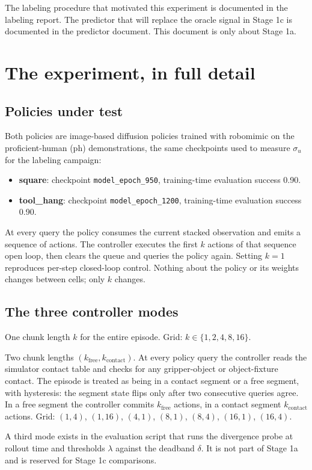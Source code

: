 \documentclass[11pt]{article}
\begin{document}
The labeling procedure that motivated this experiment is documented in the labeling
report. The predictor that will replace the oracle signal in Stage 1c is documented
in the predictor document. This document is only about Stage 1a.

\section{The experiment, in full detail}

\subsection{Policies under test}

Both policies are image-based diffusion policies trained with robomimic on the
proficient-human (ph) demonstrations, the same checkpoints used to measure
$\sigma_u$ for the labeling campaign:

\begin{itemize}[leftmargin=1.4em]
\item \textbf{square}: checkpoint \texttt{model\_epoch\_950}, training-time
evaluation success 0.90.
\item \textbf{tool\_hang}: checkpoint \texttt{model\_epoch\_1200}, training-time
evaluation success 0.90.
\end{itemize}

At every query the policy consumes the current stacked observation and emits a
sequence of actions. The controller executes the first $k$ actions of that sequence
open loop, then clears the queue and queries the policy again. Setting $k{=}1$
reproduces per-step closed-loop control. Nothing about the policy or its weights
changes between cells; only $k$ changes.

\subsection{The three controller modes}

\begin{description}[leftmargin=1.4em]
\item[fixed] One chunk length $k$ for the entire episode. Grid:
$k \in \{1, 2, 4, 8, 16\}$.
\item[oracle\_seg] Two chunk lengths $(k_{\mathrm{free}}, k_{\mathrm{contact}})$.
At every policy query the controller reads the simulator contact table and checks
for any gripper-object or object-fixture contact. The episode is treated as being
in a contact segment or a free segment, with hysteresis: the segment state flips
only after two consecutive queries agree. In a free segment the controller commits
$k_{\mathrm{free}}$ actions, in a contact segment $k_{\mathrm{contact}}$ actions.
Grid: $(1,4)$, $(1,16)$, $(4,1)$, $(8,1)$, $(8,4)$, $(16,1)$, $(16,4)$.
\item[ftle\_probe] A third mode exists in the evaluation script that runs the
divergence probe at rollout time and thresholds $\lambda$ against the deadband
$\delta$. It is not part of Stage 1a and is reserved for Stage 1c comparisons.
\end{description}
\end{document}
